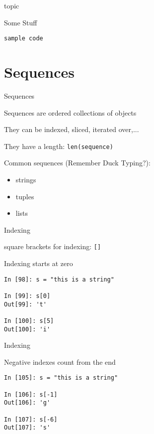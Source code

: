 \documentclass{beamer}
\begin{document}
\begin{frame}[fragile]{topic}

{\Large Some Stuff}

\begin{verbatim}
sample code
\end{verbatim}


\end{frame}


\section {Sequences}

\begin{frame}[fragile]{Sequences}

{\Large Sequences are ordered collections of objects}

\vfill
{\Large They can be indexed, sliced, iterated over,...}

\vfill
{\Large They have a length:  \verb+len(sequence)+}

\vfill
{\Large Common sequences (Remember Duck Typing?):}

{\Large
\begin{itemize}
   \item strings
   \item tuples
   \item lists
\end{itemize}
}

\end{frame}

\begin{frame}[fragile]{Indexing}

{\Large square brackets for indexing: \verb+[]+}

\vfill
{\Large Indexing starts at zero}

\begin{verbatim}
In [98]: s = "this is a string"

In [99]: s[0]
Out[99]: 't'

In [100]: s[5]
Out[100]: 'i'
\end{verbatim}

\end{frame}

\begin{frame}[fragile]{Indexing}

{\Large Negative indexes count from the end}

\vfill
\begin{verbatim}
In [105]: s = "this is a string"

In [106]: s[-1]
Out[106]: 'g'

In [107]: s[-6]
Out[107]: 's'
\end{verbatim}

\end{frame}
\end{document}

